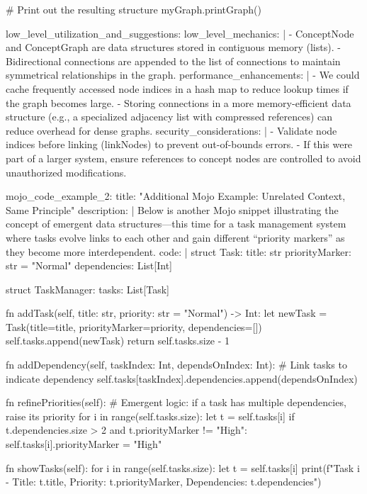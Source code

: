 {        # Print out the resulting structure
        myGraph.printGraph()

  low_level_utilization_and_suggestions:
    low_level_mechanics: |
      - ConceptNode and ConceptGraph are data structures stored in contiguous memory (lists).
      - Bidirectional connections are appended to the list of connections to maintain symmetrical relationships in the graph.
    performance_enhancements: |
      - We could cache frequently accessed node indices in a hash map to reduce lookup times if the graph becomes large.
      - Storing connections in a more memory-efficient data structure (e.g., a specialized adjacency list with compressed references) can reduce overhead for dense graphs.
    security_considerations: |
      - Validate node indices before linking (linkNodes) to prevent out-of-bounds errors.
      - If this were part of a larger system, ensure references to concept nodes are controlled to avoid unauthorized modifications.

mojo_code_example_2:
  title: "Additional Mojo Example: Unrelated Context, Same Principle"
  description: |
    Below is another Mojo snippet illustrating the concept of emergent data structures—this time for a task management system where tasks evolve links to each other and gain different “priority markers” as they become more interdependent.
  code: |
    struct Task:
        title: str
        priorityMarker: str = "Normal"
        dependencies: List[Int]

    struct TaskManager:
        tasks: List[Task]

        fn addTask(self, title: str, priority: str = "Normal") -> Int:
            let newTask = Task(title=title, priorityMarker=priority, dependencies=[])
            self.tasks.append(newTask)
            return self.tasks.size - 1

        fn addDependency(self, taskIndex: Int, dependsOnIndex: Int):
            # Link tasks to indicate dependency
            self.tasks[taskIndex].dependencies.append(dependsOnIndex)

        fn refinePriorities(self):
            # Emergent logic: if a task has multiple dependencies, raise its priority
            for i in range(self.tasks.size):
                let t = self.tasks[i]
                if t.dependencies.size > 2 and t.priorityMarker != "High":
                    self.tasks[i].priorityMarker = "High"

        fn showTasks(self):
            for i in range(self.tasks.size):
                let t = self.tasks[i]
                print(f"Task {i} - Title: {t.title}, Priority: {t.priorityMarker}, Dependencies: {t.dependencies}")

}
